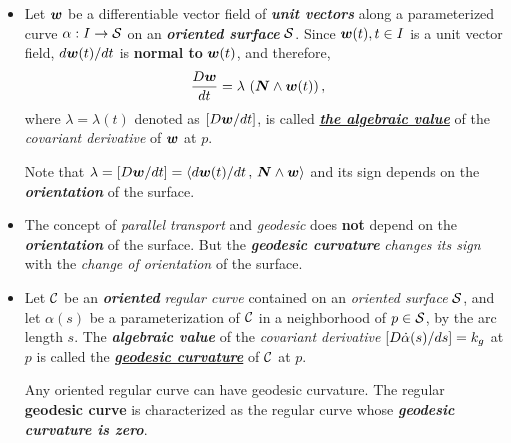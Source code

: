\documentclass[11pt]{article}
\begin{document}
\begin{itemize}
\item \begin{definition}
Let $\boldsymbol{w}$ be a differentiable vector field of \emph{\textbf{unit vectors}} along a parameterized curve $\alpha: I \rightarrow {\mathcal S}$ on an \emph{\textbf{oriented surface}} ${\mathcal S}$. Since $\boldsymbol{w}(t), t\in I$ is a unit vector field, $d\boldsymbol{w}(t)/dt$ is \textbf{normal to} $\boldsymbol{w}(t)$, and therefore, 
\begin{align*}
\frac{D\boldsymbol{w}}{dt} &= \lambda\,\left(\boldsymbol{N} \wedge \boldsymbol{w}(t)\right),
\end{align*} 
where $\lambda = \lambda(t)$ denoted as $\left[D\boldsymbol{w}/dt\right]$, is called \underline{\emph{\textbf{the algebraic value}}} of the \emph{covariant derivative} of $\boldsymbol{w}$ at $p$.
\end{definition}

Note that $\lambda = \left[D\boldsymbol{w}/dt\right] = \left\langle d\boldsymbol{w}(t)/dt\,,\, \boldsymbol{N} \wedge \boldsymbol{w} \right\rangle$ and its sign depends on the \emph{\textbf{orientation}} of the surface. 

\item The concept of \emph{parallel transport} and \emph{geodesic} does \textbf{not} depend on the \emph{\textbf{orientation}} of the surface. But the \emph{\textbf{geodesic curvature}} \emph{changes its sign} with the \emph{change of orientation} of the surface.

\item \begin{definition}
Let ${\mathcal C}$ be an \emph{\textbf{oriented}} \emph{regular curve} contained on an \emph{oriented surface} ${\mathcal S}$, and let $\alpha(s)$ be a parameterization of ${\mathcal C}$ in a neighborhood of $p\in {\mathcal S}$, by the arc length $s$. The \emph{\textbf{algebraic value}} of the \emph{covariant derivative} $\left[D\dot{\alpha}(s)/ds\right] = k_{g}$ at $p$ is called the \underline{\emph{\textbf{geodesic curvature}}} of ${\mathcal C}$ at $p$. 
\end{definition}
Any oriented regular curve can have geodesic curvature. The regular \textbf{geodesic curve} is characterized as the regular curve whose \emph{\textbf{geodesic curvature is zero}}.  


\end{itemize}
\end{document}
